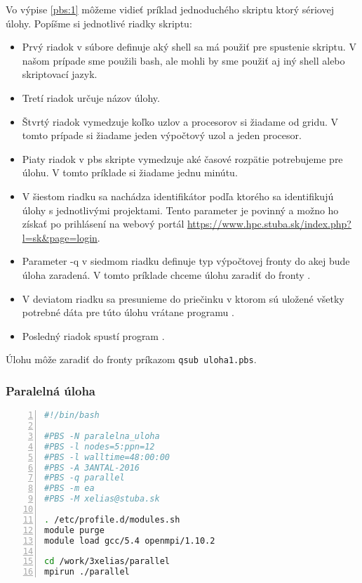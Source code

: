 Vo výpise \ref{pbs:1} môžeme vidieť príklad jednoduchého skriptu ktorý sériovej úlohy.
Popíšme si jednotlivé riadky skriptu:
\begin{itemize}
\item
  Prvý riadok v súbore definuje aký shell sa má použiť pre spustenie skriptu.
  V našom prípade sme použili \acrshort{bash}, ale mohli by sme použiť aj iný shell alebo skriptovací jazyk.
\item
  Tretí riadok určuje názov úlohy.
\item
  Štvrtý riadok vymedzuje koľko uzlov a procesorov si žiadame od gridu.
  V tomto prípade si žiadame jeden výpočtový uzol a jeden procesor.
\item
  Piaty riadok v \acrshort{pbs} skripte vymedzuje aké časové rozpätie potrebujeme pre úlohu.
  V tomto príklade si žiadame jednu minútu.
\item
  V šiestom riadku sa nachádza identifikátor podľa ktorého sa identifikujú úlohy s jednotlivými projektami.
  Tento parameter je povinný a možno ho získať po prihlásení na webový portál \url{https://www.hpc.stuba.sk/index.php?l=sk&page=login}.
\item
  Parameter -q v siedmom riadku definuje typ výpočtovej fronty do akej bude úloha zaradená.
  V tomto príklade chceme úlohu zaradiť do fronty .
\item
  V deviatom riadku sa presunieme do priečinku v ktorom sú uložené všetky potrebné dáta pre túto úlohu vrátane programu .
\item
  Posledný riadok spustí program .
\end{itemize}
Úlohu môže zaradiť do fronty príkazom \texttt{qsub uloha1.pbs}.

\subsubsection{Paralelná úloha}
\begin{lstlisting}[language=bash, caption={uloha2.pbs}, label={pbs:2}, numbers=left]
#!/bin/bash

#PBS -N paralelna_uloha
#PBS -l nodes=5:ppn=12
#PBS -l walltime=48:00:00  
#PBS -A 3ANTAL-2016
#PBS -q parallel
#PBS -m ea
#PBS -M xelias@stuba.sk

. /etc/profile.d/modules.sh
module purge
module load gcc/5.4 openmpi/1.10.2

cd /work/3xelias/parallel
mpirun ./parallel
\end{lstlisting}

